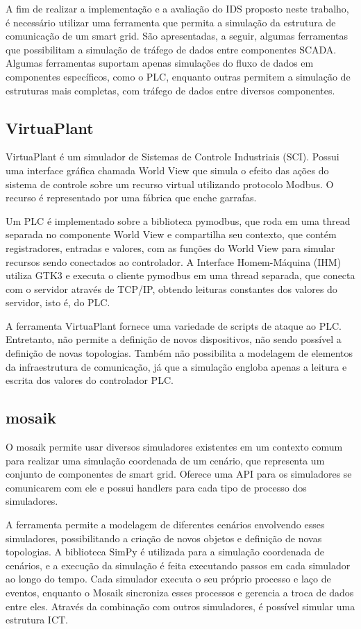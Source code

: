 \documentclass[cic,tc]{iiufrgs}
\begin{document}
A fim de realizar a implementação e a avaliação do IDS proposto neste trabalho, é necessário utilizar uma ferramenta que permita a simulação da estrutura de comunicação de um smart grid. São apresentadas, a seguir, algumas ferramentas que possibilitam a simulação de tráfego de dados entre componentes SCADA. Algumas ferramentas suportam apenas simulações do fluxo de dados em componentes específicos, como o PLC, enquanto outras permitem a simulação de estruturas mais completas, com tráfego de dados entre diversos componentes.


\subsection{VirtuaPlant}
VirtuaPlant \cite{virtuaplantwebsite} é um simulador de Sistemas de Controle Industriais (SCI). Possui uma interface gráfica chamada World View que simula o efeito das ações do sistema de controle sobre um recurso virtual utilizando protocolo Modbus. O recurso é representado por uma fábrica que enche garrafas.
	
Um PLC é implementado sobre a biblioteca pymodbus, que roda em uma thread separada no componente World View e compartilha seu contexto, que contém registradores, entradas e valores, com as funções do World View para simular recursos sendo conectados ao controlador. A Interface Homem-Máquina (IHM) utiliza GTK3 e executa o cliente pymodbus em uma thread separada, que conecta com o servidor através de TCP/IP, obtendo leituras constantes dos valores do servidor, isto é, do PLC.

A ferramenta VirtuaPlant fornece uma variedade de scripts de ataque ao PLC. Entretanto, não permite a definição de novos dispositivos, não sendo possível a definição de novas topologias. Também não possibilita a modelagem de elementos da infraestrutura de comunicação, já que a simulação engloba apenas a leitura e escrita dos valores do controlador PLC.

\subsection{mosaik}
O mosaik \cite{mosaikwebsite} permite usar diversos simuladores existentes em um contexto comum para realizar uma simulação coordenada de um cenário, que representa um conjunto de componentes de smart grid. Oferece uma API para os simuladores se comunicarem com ele e possui handlers para cada tipo de processo dos simuladores.
	
A ferramenta permite a modelagem de diferentes cenários envolvendo esses simuladores, possibilitando a criação de novos objetos e definição de novas topologias. A biblioteca SimPy é utilizada para a simulação coordenada de cenários, e a execução da simulação é feita executando passos em cada simulador ao longo do tempo. Cada simulador executa o seu próprio processo e laço de eventos, enquanto o Mosaik sincroniza esses processos e gerencia a troca de dados entre eles. Através da combinação com outros simuladores, é possível simular uma estrutura ICT.
\end{document}
